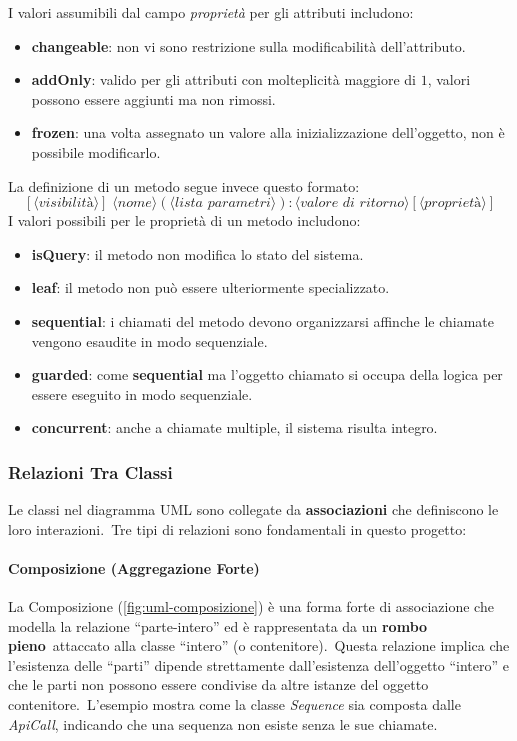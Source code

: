 I valori assumibili dal campo \textit{proprietà} per gli attributi includono:
\begin{itemize}
    \item \textbf{changeable}: non vi sono restrizione sulla modificabilità dell'attributo.
    \item \textbf{addOnly}: valido per gli attributi con molteplicità maggiore di $1$, valori possono essere aggiunti ma non rimossi.
    \item \textbf{frozen}: una volta assegnato un valore alla inizializzazione dell'oggetto, non è possibile modificarlo.
\end{itemize}

La definizione di un metodo segue invece questo formato:
\[
    [\langle \textit{visibilità} \rangle] \;
    \langle \textit{nome} \rangle
    (\langle \textit{lista parametri} \rangle)
    : \langle \textit{valore di ritorno} \rangle
    [\langle \textit{proprietà} \rangle]
\]
I valori possibili per le proprietà di un metodo includono:

\begin{itemize}
    \item \textbf{isQuery}: il metodo non modifica lo stato del sistema.
    \item \textbf{leaf}: il metodo non può essere ulteriormente specializzato.
    \item \textbf{sequential}: i chiamati del metodo devono organizzarsi affinche le chiamate vengono esaudite in modo sequenziale.
    \item \textbf{guarded}: come \textbf{sequential} ma l'oggetto chiamato si occupa della logica per essere eseguito in modo sequenziale.
    \item \textbf{concurrent}: anche a chiamate multiple, il sistema risulta integro.
\end{itemize}

\subsubsection{Relazioni Tra Classi}

Le classi nel diagramma UML sono collegate da \textbf{associazioni} che definiscono le loro interazioni.\
Tre tipi di relazioni sono fondamentali in questo progetto:

\paragraph{Composizione (Aggregazione Forte)}
La Composizione (\autoref{fig:uml-composizione}) è una forma forte di associazione che modella la relazione ``parte-intero'' ed è rappresentata da un \textbf{rombo pieno}\
attaccato alla classe ``intero'' (o contenitore).\
Questa relazione implica che l'esistenza delle ``parti'' dipende strettamente dall'esistenza dell'oggetto ``intero'' e che le parti non possono essere condivise da altre istanze del oggetto contenitore.\
L'esempio mostra come la classe \textit{Sequence} sia composta dalle \textit{ApiCall}, indicando che una sequenza non esiste senza le sue chiamate.


